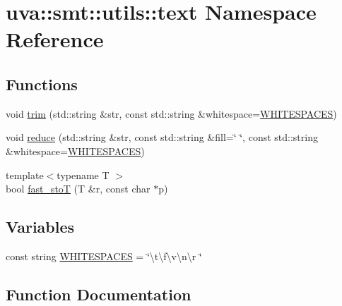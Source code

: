 \hypertarget{namespaceuva_1_1smt_1_1utils_1_1text}{}\section{uva\+:\+:smt\+:\+:utils\+:\+:text Namespace Reference}
\label{namespaceuva_1_1smt_1_1utils_1_1text}
\subsection*{Functions}
\begin{DoxyCompactItemize}
\item 
void \hyperlink{namespaceuva_1_1smt_1_1utils_1_1text_a503e3fe0a1b6e85afccb16ea257069ec}{trim} (std\+::string \&str, const std\+::string \&whitespace=\hyperlink{namespaceuva_1_1smt_1_1utils_1_1text_a1251cf45616a5bc009c8dfb643b794e1}{W\+H\+I\+T\+E\+S\+P\+A\+C\+E\+S})
\item 
void \hyperlink{namespaceuva_1_1smt_1_1utils_1_1text_a59495b5dced26bf68dcc3eec15d16fcd}{reduce} (std\+::string \&str, const std\+::string \&fill=\char`\"{} \char`\"{}, const std\+::string \&whitespace=\hyperlink{namespaceuva_1_1smt_1_1utils_1_1text_a1251cf45616a5bc009c8dfb643b794e1}{W\+H\+I\+T\+E\+S\+P\+A\+C\+E\+S})
\item 
{\footnotesize template$<$typename T $>$ }\\bool \hyperlink{namespaceuva_1_1smt_1_1utils_1_1text_a04b838a2ffa29661c25528c966c799f6}{fast\+\_\+sto\+T} (T \&r, const char $\ast$p)
\end{DoxyCompactItemize}
\subsection*{Variables}
\begin{DoxyCompactItemize}
\item 
const string \hyperlink{namespaceuva_1_1smt_1_1utils_1_1text_a1251cf45616a5bc009c8dfb643b794e1}{W\+H\+I\+T\+E\+S\+P\+A\+C\+E\+S} = \char`\"{}\textbackslash{}t\textbackslash{}f\textbackslash{}v\textbackslash{}n\textbackslash{}r \char`\"{}
\end{DoxyCompactItemize}


\subsection{Function Documentation}
\hypertarget{namespaceuva_1_1smt_1_1utils_1_1text_a04b838a2ffa29661c25528c966c799f6}{}
